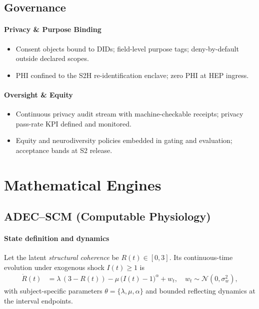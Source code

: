 \documentclass[11pt]{article}
\theoremstyle{plain}
\begin{document}
\subsection{Governance}
\paragraph{Privacy \& Purpose Binding}
\begin{itemize}
  \item Consent objects bound to DIDs; field-level purpose tags; deny-by-default outside declared scopes.
  \item PHI confined to the S2H re-identification enclave; zero PHI at HEP ingress.
\end{itemize}

\paragraph{Oversight \& Equity}
\begin{itemize}
  \item Continuous privacy audit stream with machine-checkable receipts; privacy pass-rate KPI defined and monitored.
  \item Equity and neurodiversity policies embedded in gating and evaluation; acceptance bands at S2 release.
\end{itemize}


\section{Mathematical Engines}

\subsection{ADEC--SCM (Computable Physiology)}

\paragraph{State definition and dynamics}
Let the latent \emph{structural coherence} be $R(t)\in[0,3]$. Its continuous-time evolution under exogenous shock $I(t)\ge 1$ is
\begin{align}
\dot{R}(t) &= \lambda\,(3-R(t)) - \mu\,\big(I(t)-1\big)^{\alpha} + w_t,
\quad w_t \sim \mathcal{N}(0,\sigma_w^2),
\label{eq:adec-ode}
\end{align}
with subject-specific parameters $\theta=\{\lambda,\mu,\alpha\}$ and bounded reflecting dynamics at the interval endpoints.
\end{document}
